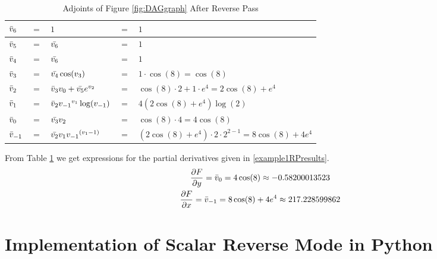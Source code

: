 \documentclass{article}
\begin{document}
\begin{table}[h!]
    \centering
    \begin{tabular}{|lclll|}
        \hline
        $\Bar{v}_{6}$ & $=$ & $1$ & $=$ & $1$ \\
        \hline
        $\Bar{v}_{5}$ & $=$ & $\Bar{v_6}$ & $=$ & $1$\\
        $\Bar{v}_{4}$ & $=$ & $\Bar{v_6}$ & $=$ & $1$\\
        $\Bar{v}_{3}$ & $=$ & $\Bar{v_4}\cos(v_3)$ & $=$ & $1 \cdot \cos(8) = \cos(8)$ \\
        $\Bar{v}_{2}$ & $=$ & $\Bar{v}_{3}v_0 + \Bar{v_5}e^{v_2}$ & $=$ & $\cos(8) \cdot 2 + 1 \cdot e^{4} = 2\cos(8)+e^4$ \\
        $\Bar{v}_{1}$ & $=$ & $\Bar{v}_{2}{v_{-1}}^{v_{1}}\log(v_{-1})$ & $=$ & $4(2\cos(8)+e^4)\log(2)$ \\
        \hline
        $\Bar{v}_{0}$ & $=$ & $\Bar{v_3}v_2$ & $=$ & $\cos(8)\cdot4 = 4\cos(8)$ \\
        $\Bar{v}_{-1}$ & $=$ & $\Bar{v_2}v_1 {v_{-1}}^{(v_{1}-1)}$ & $=$ & $(2\cos(8)+e^4) \cdot 2 \cdot 2^{2-1} = 8\cos(8)+4e^4$ \\
        \hline   
    \end{tabular}
    \caption{Adjoints of Figure \ref{fig:DAGgraph} After Reverse Pass}
    \label{tab:example1RP}
\end{table}
From Table \ref{tab:example1RP} we get expressions for the partial derivatives given in \eqref{example1RPresults}.
\begin{equation} \label{example1RPresults}
    \begin{gathered}
    \frac{\partial F}{\partial y} = \Bar{v}_0 =  4\cos(8) \approx -0.58200013523 \\
    \frac{\partial F}{\partial x} = \Bar{v}_{-1} = 8\cos(8) + 4e^4 \approx 217.228599862
    \end{gathered}
\end{equation}

\newpage
\section{Implementation of Scalar Reverse Mode in Python}
\end{document}
